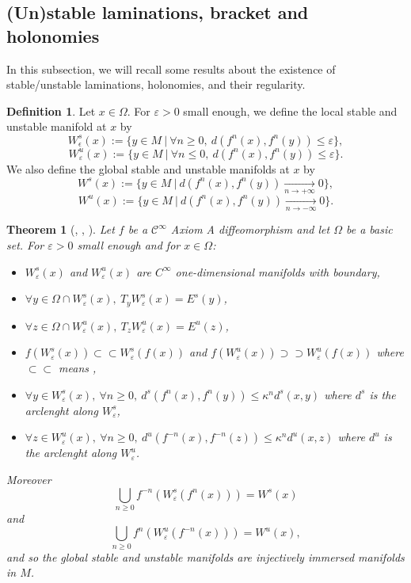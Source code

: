 \documentclass[a4paper]{article}
\newtheorem{theorem}{Theorem}[section]
\theoremstyle{definition}
\newtheorem{definition}{Definition}[section]
\begin{document}
\subsection{(Un)stable laminations, bracket and holonomies}

In this subsection, we will recall some results about the existence of stable/unstable laminations, holonomies, and their regularity.

\begin{definition}

Let $x \in \Omega$. For $\varepsilon>0$ small enough, we define the local stable and unstable manifold at $x$ by $$ W^s_{\epsilon}(x) := \{ y \in M \ | \ \forall n \geq 0, \ d(f^n(x),f^n(y)) \leq \varepsilon \}, $$
$$ W^u_\varepsilon(x) := \{ y \in M \ | \ \forall n \leq 0, \ d(f^n(x),f^n(y)) \leq \varepsilon \} .$$
We also define the global stable and unstable manifolds at $x$ by
$$ W^s(x) := \{ y \in M \ |  \ d(f^n(x),f^n(y)) \underset{n \rightarrow +\infty}{\longrightarrow} 0 \} ,$$
$$ W^u(x) := \{ y \in M \ | \ d(f^n(x),f^n(y)) \underset{n \rightarrow -\infty}{\longrightarrow} 0 \}.  $$

\end{definition}

\begin{theorem}[\cite{BS02}, \cite{KH95}, \cite{Bo75}]

Let $f$ be a $\mathcal{C}^\infty$ Axiom A diffeomorphism and let $\Omega$ be a basic set.
For $\varepsilon>0$ small enough and for $x \in \Omega$:
\begin{itemize}
    \item $W^s_\varepsilon(x)$ and $W^u_\varepsilon(x)$  are $C^\infty$ one-dimensional manifolds with boundary,
    \item $\forall y \in \Omega \cap W^s_\varepsilon(x), \ T_y W^s_\varepsilon (x) = E^s(y)$,
    \item $\forall z \in \Omega \cap W^u_\varepsilon(x), \ T_z W^u_\varepsilon (x) = E^u(z)$,
    \item $f(W^s_\varepsilon(x)) \subset \subset W^s_\varepsilon(f(x))$ and $ f(W^u_\varepsilon(x)) \supset \supset W^u_\varepsilon(f(x)) $ where $\subset \subset$ means ,
    \item $ \forall y \in W^s_\varepsilon(x), \ \forall n \geq 0,  \ d^s(f^n(x),f^n(y)) \leq  \kappa^n d^s(x,y) $ where $d^s$ is the arclenght along $W^s_\varepsilon$,
    \item $ \forall z \in W^u_\varepsilon(x), \ \forall n \geq 0, \ d^u(f^{-n}(x),f^{-n}(z)) \leq  \kappa^{n} d^u(x,z) $ where $d^u$ is the arclenght along $W^u_\varepsilon$.
\end{itemize}
Moreover
$$ \bigcup_{n \geq 0} f^{-n}(W^s_\varepsilon(f^n(x))) = W^s(x)  $$
and $$ \bigcup_{n \geq 0} f^{n}(W^u_\varepsilon(f^{-n}(x))) = W^u(x),$$
and so the global stable and unstable manifolds are injectively immersed manifolds in $M$.


\end{theorem}
\end{document}
